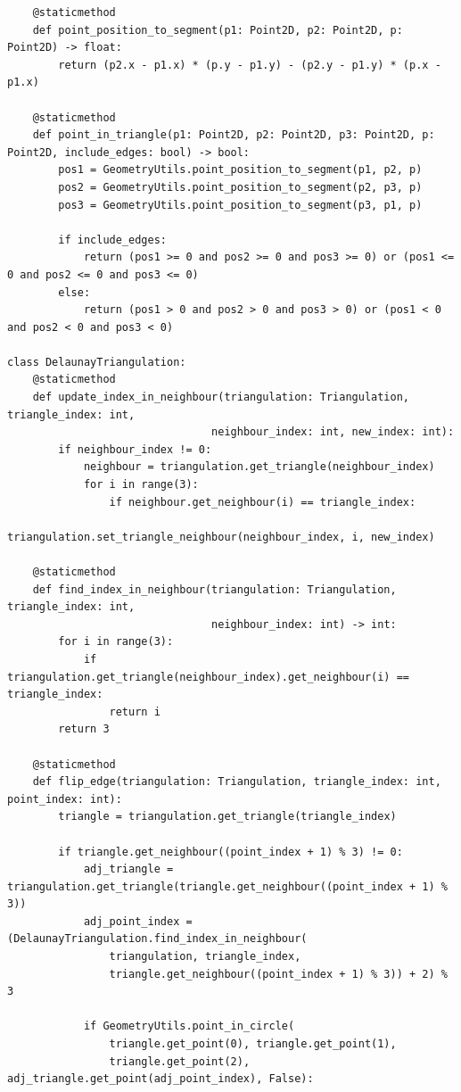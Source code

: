 \documentclass{article}
\begin{document}
\begin{lstlisting}
    @staticmethod
    def point_position_to_segment(p1: Point2D, p2: Point2D, p: Point2D) -> float:
        return (p2.x - p1.x) * (p.y - p1.y) - (p2.y - p1.y) * (p.x - p1.x)

    @staticmethod
    def point_in_triangle(p1: Point2D, p2: Point2D, p3: Point2D, p: Point2D, include_edges: bool) -> bool:
        pos1 = GeometryUtils.point_position_to_segment(p1, p2, p)
        pos2 = GeometryUtils.point_position_to_segment(p2, p3, p)
        pos3 = GeometryUtils.point_position_to_segment(p3, p1, p)
        
        if include_edges:
            return (pos1 >= 0 and pos2 >= 0 and pos3 >= 0) or (pos1 <= 0 and pos2 <= 0 and pos3 <= 0)
        else:
            return (pos1 > 0 and pos2 > 0 and pos3 > 0) or (pos1 < 0 and pos2 < 0 and pos3 < 0)

class DelaunayTriangulation:
    @staticmethod
    def update_index_in_neighbour(triangulation: Triangulation, triangle_index: int, 
                                neighbour_index: int, new_index: int):
        if neighbour_index != 0:
            neighbour = triangulation.get_triangle(neighbour_index)
            for i in range(3):
                if neighbour.get_neighbour(i) == triangle_index:
                    triangulation.set_triangle_neighbour(neighbour_index, i, new_index)

    @staticmethod
    def find_index_in_neighbour(triangulation: Triangulation, triangle_index: int, 
                                neighbour_index: int) -> int:
        for i in range(3):
            if triangulation.get_triangle(neighbour_index).get_neighbour(i) == triangle_index:
                return i
        return 3

    @staticmethod
    def flip_edge(triangulation: Triangulation, triangle_index: int, point_index: int):
        triangle = triangulation.get_triangle(triangle_index)
        
        if triangle.get_neighbour((point_index + 1) % 3) != 0:
            adj_triangle = triangulation.get_triangle(triangle.get_neighbour((point_index + 1) % 3))
            adj_point_index = (DelaunayTriangulation.find_index_in_neighbour(
                triangulation, triangle_index, 
                triangle.get_neighbour((point_index + 1) % 3)) + 2) % 3
            
            if GeometryUtils.point_in_circle(
                triangle.get_point(0), triangle.get_point(1), 
                triangle.get_point(2), adj_triangle.get_point(adj_point_index), False):
                

\end{lstlisting}
\end{document}
